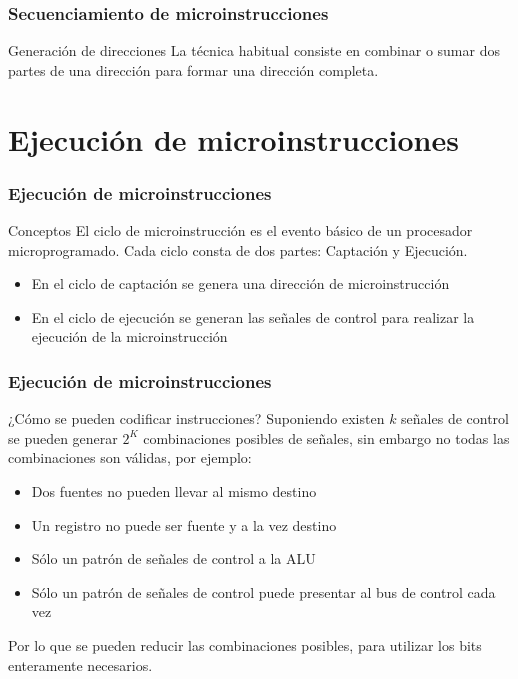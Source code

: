 \documentclass{beamer}
\begin{document}
\begin{frame}
	\frametitle{Secuenciamiento de microinstrucciones}
	\begin{block}{Generación de direcciones}
	La técnica habitual consiste en combinar o sumar dos partes de una dirección para formar una dirección completa.
	\end{block}	
\end{frame}


\section{Ejecución de microinstrucciones}

\begin{frame}
	\frametitle{Ejecución de microinstrucciones}
	\begin{block}{Conceptos}
	El ciclo de microinstrucción es el evento básico de un procesador microprogramado. Cada ciclo consta de dos partes: Captación y Ejecución.
	\begin{itemize}
		\item En el ciclo de captación se genera una dirección de microinstrucción
		\item En el ciclo de ejecución se generan las señales de control para realizar la ejecución de la microinstrucción
	\end{itemize}
	\end{block}	
\end{frame}

\begin{frame}
	\frametitle{Ejecución de microinstrucciones}
	\begin{block}{¿Cómo se pueden codificar instrucciones?}
	Suponiendo existen $k$ señales de control se pueden generar $2^K$ combinaciones posibles de señales, sin embargo no todas las combinaciones son válidas, por ejemplo:
	\begin{itemize}
		\item Dos fuentes no pueden llevar al mismo destino
		\item Un registro no puede ser fuente y a la vez destino
		\item Sólo un patrón de señales de control a la ALU
		\item Sólo un patrón de señales de control puede presentar al bus de control cada vez
	\end{itemize}
	Por lo que se pueden reducir las combinaciones posibles, para utilizar los bits enteramente necesarios.
	\end{block}	
\end{frame}
\end{document}
